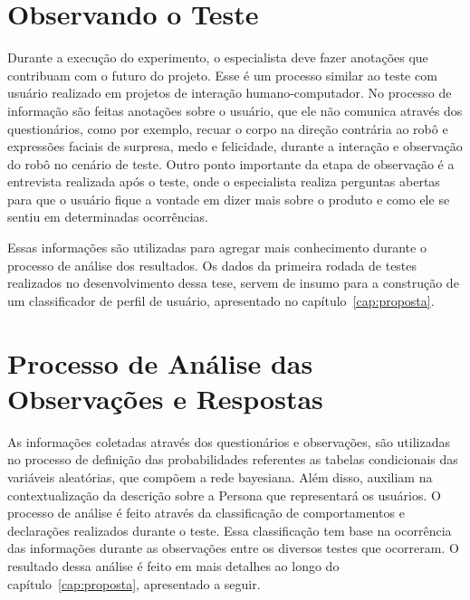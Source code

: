 \section{Observando o Teste}
\label{sec:observacoesteste}
Durante a execução do experimento, o especialista deve fazer anotações que contribuam com o futuro do projeto. Esse é um processo similar ao teste com usuário realizado em projetos de interação humano-computador. No processo de informação são feitas anotações sobre o usuário, que ele não comunica através dos questionários, como por exemplo, recuar o corpo na direção contrária ao robô e expressões faciais de surpresa, medo e felicidade, durante a interação e observação do robô no cenário de teste. Outro ponto importante da etapa de observação é a entrevista realizada após o teste, onde o especialista realiza perguntas abertas para que o usuário fique a vontade em dizer mais sobre o produto e como ele se sentiu em determinadas ocorrências.

Essas informações são utilizadas para agregar mais conhecimento durante o processo de análise dos resultados. Os dados da primeira rodada de testes realizados no desenvolvimento dessa tese, servem de insumo para a construção de um classificador de perfil de usuário, apresentado no capítulo~\ref{cap:proposta}.

\section{Processo de Análise das Observações e Respostas}
\label{sec:analise}
As informações coletadas através dos questionários e observações, são utilizadas no processo de definição das probabilidades referentes as tabelas condicionais das variáveis aleatórias, que compõem a rede bayesiana. Além disso, auxiliam na contextualização da descrição sobre a Persona que representará os usuários. O processo de análise é feito através da classificação de comportamentos e declarações realizados durante o teste. Essa classificação tem base na ocorrência das informações durante as observações entre os diversos testes que ocorreram. O resultado dessa análise é feito em mais detalhes ao longo do capítulo~\ref{cap:proposta}, apresentado a seguir.
